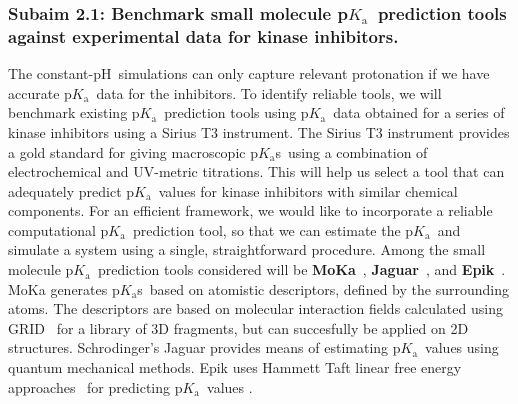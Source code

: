 \documentclass[10pt,final]{article}
\newcommand{\pKa}{p$K_\mathrm{a}$\ }
\newcommand{\pH}{p$\mathrm{H}$\ }
\newcommand{\pKas}{p$K_\mathrm{a}$s\ }
\begin{document}
\subsubsection*{Subaim 2.1: Benchmark small molecule \pKa prediction tools against experimental data for kinase inhibitors.}
The constant-\pH simulations can only capture relevant protonation if we have accurate \pKa data for the inhibitors.
%
To identify reliable tools, we will benchmark existing \pKa prediction tools using \pKa data obtained for a series of kinase inhibitors using a Sirius T3 instrument.
%
The Sirius T3 instrument provides a gold standard for giving macroscopic \pKas using a combination of electrochemical and UV-metric titrations.
%
This will help us select a tool that can adequately predict \pKa values for kinase inhibitors with similar chemical components.
%
For an efficient framework, we would like to incorporate a reliable computational \pKa prediction tool, so that we can estimate the \pKa and simulate a system using a single, straightforward procedure.
%
Among the small molecule \pKa prediction tools considered will be \textbf{MoKa}~\autocite{Milletti2007a}, \textbf{Jaguar}~\autocite{Bochevarov2013a}, and \textbf{Epik}~\autocite{Shelley2007a,Greenwood2010a}.
%
MoKa generates \pKas based on atomistic descriptors, defined by the surrounding atoms.
%
The descriptors are based on molecular interaction fields calculated using GRID~\autocite{Goodford1985a} for a library of 3D fragments, but can succesfully be applied on 2D structures.
%
Schrodinger's Jaguar provides means of estimating \pKa values using quantum mechanical methods.
%
Epik uses Hammett Taft linear free energy approaches~\autocite{Perrin1981a} for predicting \pKa values .
\end{document}
